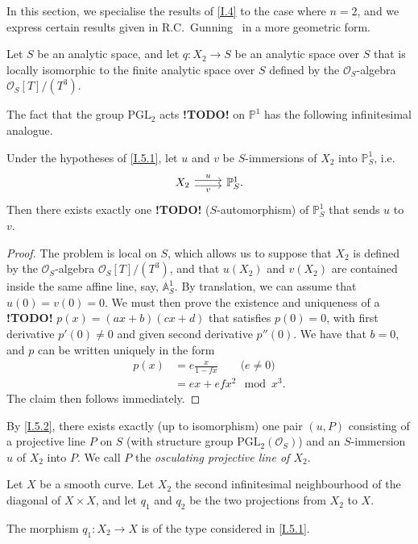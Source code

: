 \documentclass{report}
\theoremstyle{plain}
\newenvironment{lemma}[1]
    {\renewcommand\theinnercustomlemma{#1}\innercustomlemma}
    {\endinnercustomlemma}
\theoremstyle{definition}
\newenvironment{env}[1]
    {\renewcommand\theinnercustomenv{#1}\innercustomenv}
    {\endinnercustomenv}
\newcommand{\sh}[1]{{\mathscr{#1}}}
\newcommand{\PP}{\mathbb{P}}
\renewcommand{\AA}{\mathbb{A}}
\newcommand{\todo}{\textbf{ !TODO! }}
\newcommand{\oldpage}[1]{\marginpar{\footnotesize$\Big\vert$ \textit{p.~#1}}}
\begin{document}
In this section, we specialise the results of \cref{I.4} to the case where $n=2$, and we express certain results given in R.C.~Gunning~\cite{11} in a more geometric form.

\begin{env}{5.1}
\label{I.5.1}
  Let $S$ be an analytic space, and let $q\colon X_2\to S$ be an analytic space over $S$ that is locally isomorphic to the finite analytic space over $S$ defined by the $\sh{O}_S$-algebra $\sh{O}_S[T]/(T^3)$.

  The fact that the group $\mathrm{PGL}_2$ acts \todo on $\PP^1$ has the following infinitesimal analogue.
\end{env}

\begin{lemma}{5.2}
\label{I.5.2}
  Under the hypotheses of \cref{I.5.1}, let $u$ and $v$ be $S$-immersions of $X_2$ into $\PP_S^1$, i.e.
  \[
    \begin{tikzcd}
      X_2 \rar[shift left=1,"u"] \rar[shift right=1,swap,"v"]
      & \PP_S^1.
    \end{tikzcd}
  \]
  Then there exists exactly one \todo ($S$-automorphism) of $\PP_S^1$ that sends $u$ to $v$.
\end{lemma}

\begin{proof}
  The problem is local on $S$, which allows us to suppose that $X_2$ is defined by the $\sh{O}_S$-algebra $\sh{O}_S[T]/(T^3)$, and that $u(X_2)$ and $v(X_2)$ are contained inside the same affine line, say, $\AA_S^1$.
  By translation, we can assume that $u(0)=v(0)=0$.
  We must then prove the existence and uniqueness of a \todo $p(x)=(ax+b)(cx+d)$ that satisfies $p(0)=0$, with first derivative $p'(0)\neq0$ and given second derivative $p''(0)$.
  We have that $b=0$, and $p$ can be written uniquely in the form
\oldpage{30}
  \[
    \begin{aligned}
      p(x)
      &= e\frac{x}{1-fx} \qquad\mbox{($e\neq0$)}
    \\&= ex + efx^2 \mod x^3.
    \end{aligned}
  \]
  The claim then follows immediately.
\end{proof}

\begin{env}{5.3}
\label{I.5.3}
  By \cref{I.5.2}, there exists exactly (up to isomorphism) one pair $(u,P)$ consisting of a projective line $P$ on $S$ (with structure group $\mathrm{PGL}_2(\sh{O}_S)$) and an $S$-immersion $u$ of $X_2$ into $P$.
  We call $P$ the \emph{osculating projective line of $X_2$}.

  Let $X$ be a smooth curve.
  Let $X_2$ the second infinitesimal neighbourhood of the diagonal of $X\times X$, and let $q_1$ and $q_2$ be the two projections from $X_2$ to $X$.

  The morphism $q_1\colon X_2\to X$ is of the type considered in \cref{I.5.1}.
\end{env}
\end{document}
